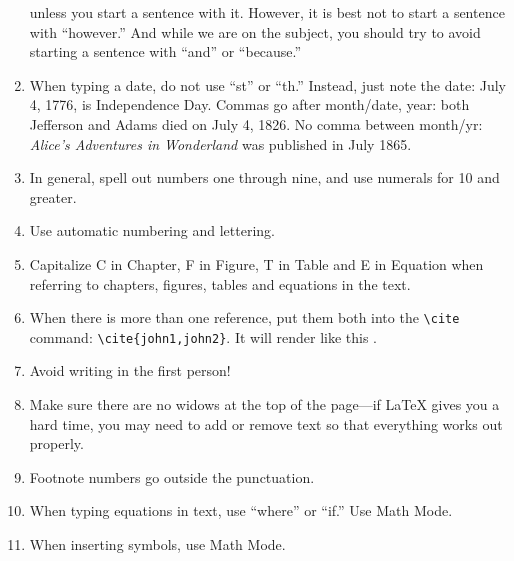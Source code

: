 \begin{enumerate}
unless you start a sentence with it. However, it is best not to start a sentence
with ``however.'' And while we are on the subject, you should try to avoid starting a sentence with ``and'' or ``because.'' 
\item When typing a date, do not use ``st'' or ``th.'' Instead, just
  note the date: July 4, 1776, is Independence Day. Commas go 
after month/date, year: both Jefferson and Adams died on July 4, 1826.
No comma between month/yr: \textit{Alice's Adventures in Wonderland} was published in July 1865.
\item In general, spell out numbers one through nine, and use numerals for 10 and greater.
\item Use automatic numbering and lettering.
\item Capitalize C in Chapter, F in Figure, T in Table and E in Equation when referring
to chapters, figures, tables and equations in the text.
\item When there is more than one reference, put them both into the \verb+\cite+ command: \verb+\cite{john1,john2}+. It will render like this \cite{IEEEhowto:IEEEtranpage,IEEEexample:shellCTANpage}.
\item Avoid writing in the first person!
\item Make sure there are no widows at the
  top of the page---if \LaTeX{} gives you a hard time, you may need to
  add or remove text so that everything works out properly.
\item Footnote numbers go outside the punctuation. 
\item When typing equations in text, use ``where'' or ``if.'' Use
  Math Mode. 
\item When inserting symbols, use Math Mode.
\end{enumerate}
